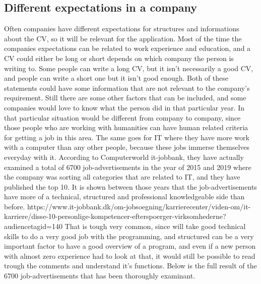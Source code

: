 



\subsection{Different expectations in a company}
Often companies have different expectations for structures and informations about the CV, so it will be relevant for the application.
Most of the time the companies expectations can be related to work experience and education,
and a CV could either be long or short depends on which company the person is writing to. Some people can write a long CV,
but it isn't necessarily a good CV, and people can write a short one but it isn't good enough.
Both of these statements could have some information that are not relevant to the company's requirement. Still there are some other
factors that can be included, and some companies would love to know what the person did in that particular year.
In that particular situation would be different from company to company, since those people who are working with humanities
can have human related criteria for getting a job in this area. The same goes for IT where they have more work with a computer
than any other people, because these jobs immerse themselves everyday with it. According to Computerworld it-jobbank,
they have actually examined a total of 6700 job-advertisements in the year of 2015 and 2019 where the company was sorting all categories
that are related to IT, and they have published the top 10. It is shown between those years that the job-advertisements
have more of a technical, structured and professional knowledgeable side than before.
https://www.it-jobbank.dk/om-jobsoegning/karrierecenter/viden-om/it-karriere/disse-10-personlige-kompetencer-efterspoerger-virksomhederne?audiencetagid=140
That is tough very common, since will take good technical skills to do a very good job with the programming,
and structured can be a very important factor to have a good overview of a program,
and even if a new person with almost zero experience had to look at that,
it would still be possible to read trough the comments and understand it's functions. Below is the full result
of the 6700 job-advertisements that has been thoroughly examinant.

